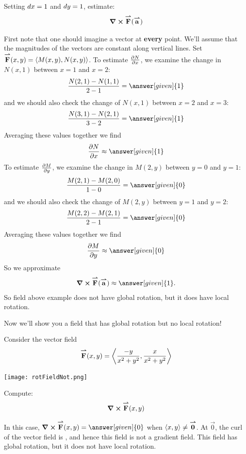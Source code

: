 \documentclass{ximera}
\begin{document}
\begin{example}
\begin{image}
      \end{image}
      Setting $\d x = 1$ and $\d y = 1$, estimate:
      \[
      \curl \vec{F}(\vec{a})
      \]
      \begin{explanation}
        First note that one should imagine a vector at \textbf{every}
        point. We'll assume that the magnitudes of the vectors are
        constant along vertical lines. Set $\vec{F}(x,y) =
        \vector{M(x,y),N(x,y)}$. To estimate $\pp[N]{x}$, we examine
        the change in $N(x,1)$ between $x=1$ and $x=2$:
        \[
        \frac{N(2,1) - N(1,1)}{2-1} = \answer[given]{1}
        \]
        and we should also check the change of $N(x,1)$ between $x=2$
        and $x=3$:
        \[
        \frac{N(3,1) - N(2,1)}{3-2} = \answer[given]{1}
        \]
        Averaging these values together we find
        \[
        \pp[N]{x} \approx \answer[given]{1}
        \]
        To estimate $\pp[M]{y}$, we examine the change in $M(2,y)$
        between $y=0$ and $y=1$:
        \[
        \frac{M(2,1) - M(2,0)}{1-0} = \answer[given]{0}
        \]
        and we should also check the change of $M(2,y)$ between $y=1$
        and $y=2$:
        \[
        \frac{M(2,2) - M(2,1)}{2-1} = \answer[given]{0}
        \]
        Averaging these values together we find
        \[
        \pp[M]{y} \approx \answer[given]{0}
        \]
        So we approximate
        \[
        \curl\vec{F}(\vec{a})\approx\answer[given]{1}.
        \]
        So field above example does not have global rotation, but it
        does have local rotation.
      \end{explanation}
\end{example}

Now we'll show you a field that has global rotation but no local rotation!

\begin{example}
  Consider the vector field
  \[
  \vec{F}(x,y) = \vector{\frac{-y}{x^2+y^2},\frac{x}{x^2+y^2}}
  \]
  \begin{image}
    \texttt{[image: rotFieldNot.png]}
  \end{image}
  Compute:
  \[
  \curl\vec{F}(x,y)
  \]
  \begin{explanation}
    In this case, $\curl\vec{F}(x,y) =\answer[given]{0}$ when
    $\vector{x,y}\ne \vec{0}$. At $\vec{0}$, the curl of the vector
    field is ,
    and hence this field is not a gradient field.  This field has
    global rotation, but it does not have local rotation.
  \end{explanation}
\end{example}
\end{document}

